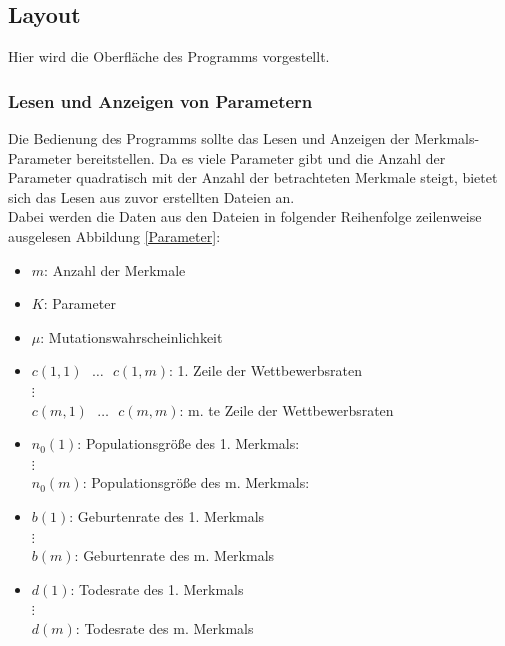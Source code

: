 \documentclass[11pt, a4paper, german]{article}
\theoremstyle{plain}
\begin{document}
	\subsection{Layout}
	Hier wird die Oberfläche des Programms vorgestellt.
	\subsubsection{Lesen und Anzeigen von Parametern}
	Die Bedienung des Programms sollte das Lesen und Anzeigen der Merkmals-Parameter bereitstellen. Da es viele Parameter gibt und die Anzahl der Parameter quadratisch mit der Anzahl der betrachteten Merkmale steigt, bietet sich das Lesen aus zuvor erstellten Dateien an.\\
	Dabei werden die Daten aus den Dateien in folgender Reihenfolge zeilenweise ausgelesen Abbildung \ref{Parameter}:
	\begin{itemize}
		\item $ m $: Anzahl der Merkmale
		\item $ K $: Parameter
		\item $ \mu $: Mutationswahrscheinlichkeit
		\item $ c(1,1) \text{ } \dots \text{ } c(1,m) $: 1. Zeile der Wettbewerbsraten \\
			$ \vdots $\\
			$ c(m,1) \text{ } \dots \text{ } c(m,m) $: m. te Zeile der Wettbewerbsraten 
		\item $ n_0(1) $: Populationsgröße des 1. Merkmals: \\
			$ \vdots $\\
			$ n_0(m) $: Populationsgröße des m. Merkmals: 
		\item $ b(1) $: Geburtenrate des 1. Merkmals\\
			$ \vdots $\\
			$ b(m) $: Geburtenrate des m. Merkmals
		\item $ d(1) $: Todesrate des 1. Merkmals\\
			$ \vdots $\\
			$ d(m) $: Todesrate des m. Merkmals
	\end{itemize}
	
\end{document}
